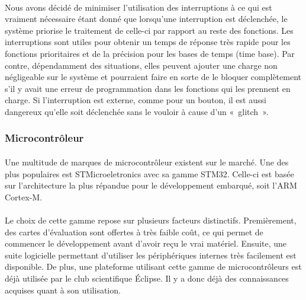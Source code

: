 		\paragraph*{}
		Nous avons décidé de minimiser l’utilisation des interruptions à ce qui est vraiment nécessaire étant donné que lorsqu’une interruption est déclenchée, le système priorise le traitement de celle-ci par rapport au reste des fonctions. Les interruptions sont utiles pour obtenir un temps de réponse très rapide pour les fonctions prioritaires et de la précision pour les bases de temps (time base). Par contre, dépendamment des situations, elles peuvent ajouter une charge non négligeable sur le système et pourraient faire en sorte de le bloquer complètement s’il y avait une erreur de programmation dans les fonctions qui les prennent en charge. Si l’interruption est externe, comme pour un bouton, il est aussi dangereux qu’elle soit déclenchée sans le vouloir à cause d’un « glitch ».

	\subsubsection*{Microcontrôleur}
		\paragraph*{}
		Une multitude de marques de microcontrôleur existent sur le marché. Une des plus populaires est STMicroeletronics avec sa gamme STM32. Celle-ci est basée sur l’architecture la plus répandue pour le développement embarqué, soit l’ARM Cortex-M.

		\paragraph*{}
		Le choix de cette gamme repose sur plusieurs facteurs distinctifs. Premièrement, des cartes d’évaluation sont offertes à très faible coût, ce qui permet de commencer le développement avant d’avoir reçu le vrai matériel. Ensuite, une suite logicielle permettant d’utiliser les périphériques internes très facilement est disponible. De plus, une plateforme utilisant cette gamme de microcontrôleurs est déjà utilisée par le club scientifique Éclipse. Il y a donc déjà des connaissances acquises quant à son utilisation.
